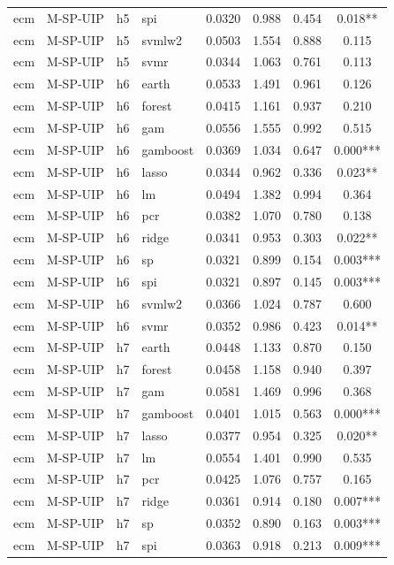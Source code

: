 \begin{ThreePartTable}
\begin{longtable}[t]{llclcccc}
ecm & M-SP-UIP & h5 & spi & 0.0320 & 0.988 & 0.454 & 0.018**\\
ecm & M-SP-UIP & h5 & svmlw2 & 0.0503 & 1.554 & 0.888 & 0.115\\
ecm & M-SP-UIP & h5 & svmr & 0.0344 & 1.063 & 0.761 & 0.113\\
\addlinespace
ecm & M-SP-UIP & h6 & earth & 0.0533 & 1.491 & 0.961 & 0.126\\
ecm & M-SP-UIP & h6 & forest & 0.0415 & 1.161 & 0.937 & 0.210\\
ecm & M-SP-UIP & h6 & gam & 0.0556 & 1.555 & 0.992 & 0.515\\
ecm & M-SP-UIP & h6 & gamboost & 0.0369 & 1.034 & 0.647 & 0.000***\\
ecm & M-SP-UIP & h6 & lasso & 0.0344 & 0.962 & 0.336 & 0.023**\\
ecm & M-SP-UIP & h6 & lm & 0.0494 & 1.382 & 0.994 & 0.364\\
ecm & M-SP-UIP & h6 & pcr & 0.0382 & 1.070 & 0.780 & 0.138\\
ecm & M-SP-UIP & h6 & ridge & 0.0341 & 0.953 & 0.303 & 0.022**\\
ecm & M-SP-UIP & h6 & sp & 0.0321 & 0.899 & 0.154 & 0.003***\\
ecm & M-SP-UIP & h6 & spi & 0.0321 & 0.897 & 0.145 & 0.003***\\
ecm & M-SP-UIP & h6 & svmlw2 & 0.0366 & 1.024 & 0.787 & 0.600\\
ecm & M-SP-UIP & h6 & svmr & 0.0352 & 0.986 & 0.423 & 0.014**\\
\addlinespace
ecm & M-SP-UIP & h7 & earth & 0.0448 & 1.133 & 0.870 & 0.150\\
ecm & M-SP-UIP & h7 & forest & 0.0458 & 1.158 & 0.940 & 0.397\\
ecm & M-SP-UIP & h7 & gam & 0.0581 & 1.469 & 0.996 & 0.368\\
ecm & M-SP-UIP & h7 & gamboost & 0.0401 & 1.015 & 0.563 & 0.000***\\
ecm & M-SP-UIP & h7 & lasso & 0.0377 & 0.954 & 0.325 & 0.020**\\
ecm & M-SP-UIP & h7 & lm & 0.0554 & 1.401 & 0.990 & 0.535\\
ecm & M-SP-UIP & h7 & pcr & 0.0425 & 1.076 & 0.757 & 0.165\\
ecm & M-SP-UIP & h7 & ridge & 0.0361 & 0.914 & 0.180 & 0.007***\\
ecm & M-SP-UIP & h7 & sp & 0.0352 & 0.890 & 0.163 & 0.003***\\
ecm & M-SP-UIP & h7 & spi & 0.0363 & 0.918 & 0.213 & 0.009***\\

\end{longtable}
\end{ThreePartTable}
